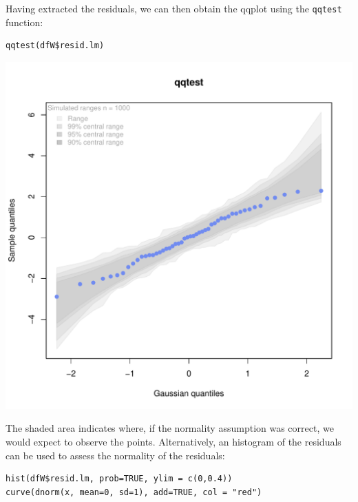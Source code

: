 \documentclass{article}
\begin{document}
\bigskip

Having extracted the residuals, we can then obtain the qqplot using
the \texttt{qqtest} function:
\lstset{language=r,label= ,caption= ,captionpos=b,numbers=none}
\begin{lstlisting}
qqtest(dfW$resid.lm)
\end{lstlisting}

\begin{center}
\includegraphics[width=.9\linewidth]{./figures/qqplot-lm.pdf}
\end{center}

The shaded area indicates where, if the normality assumption was
correct, we would expect to observe the points. Alternatively, an
histogram of the residuals can be used to assess the normality of the
residuals:
\lstset{language=r,label= ,caption= ,captionpos=b,numbers=none}
\begin{lstlisting}
hist(dfW$resid.lm, prob=TRUE, ylim = c(0,0.4))
curve(dnorm(x, mean=0, sd=1), add=TRUE, col = "red")
\end{lstlisting}
\end{document}
